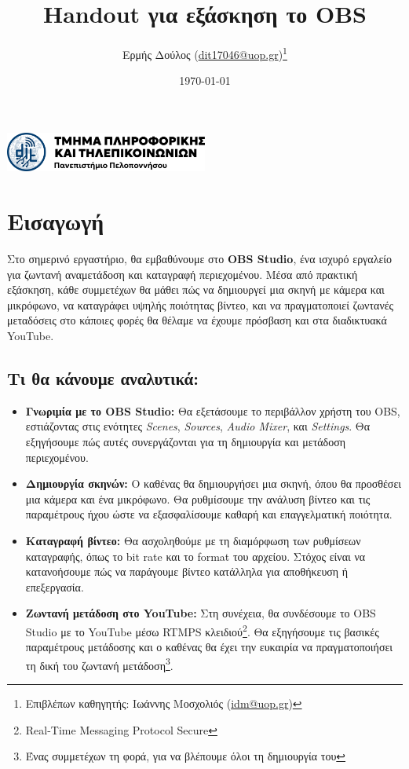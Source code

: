 \documentclass[12pt,a4paper]{article}
\title{\textbf{Handout για εξάσκηση το OBS}}
\author{Ερμής Δούλος (\href{mailto:dit17046@uop.gr}{dit17046@uop.gr})\thanks{Επιβλέπων καθηγητής: Ιωάννης Μοσχολιός (\href{mailto:idm@uop.gr}{idm@uop.gr})}}
\date{\today}
\begin{document}
\maketitle
\begin{center}
  \includegraphics[width=0.5\textwidth]{Figures/uop.png}
\end{center}
\tableofcontents
\noindent\makebox[\linewidth]{\rule{\textwidth}{1.5pt}}

\section*{Εισαγωγή}

Στο σημερινό εργαστήριο, θα εμβαθύνουμε στο \textbf{OBS Studio}, ένα ισχυρό εργαλείο
για ζωντανή αναμετάδοση και καταγραφή περιεχομένου. Μέσα από πρακτική εξάσκηση,
κάθε συμμετέχων θα μάθει πώς να δημιουργεί μια σκηνή με κάμερα και μικρόφωνο, να
καταγράφει υψηλής ποιότητας βίντεο, και να πραγματοποιεί ζωντανές μεταδόσεις στο
κάποιες φορές θα θέλαμε να έχουμε πρόσβαση και στα διαδικτυακά
YouTube.

\subsection*{Τι θα κάνουμε αναλυτικά:}

\begin{itemize}
  \item \textbf{Γνωριμία με το OBS Studio:} Θα εξετάσουμε το περιβάλλον χρήστη του
        OBS, εστιάζοντας στις ενότητες \textit{Scenes}, \textit{Sources}, \textit{Audio
          Mixer}, και \textit{Settings}. Θα εξηγήσουμε πώς αυτές συνεργάζονται για τη
        δημιουργία και μετάδοση περιεχομένου.

  \item \textbf{Δημιουργία σκηνών:} Ο καθένας θα δημιουργήσει μια σκηνή, όπου θα
        προσθέσει μια κάμερα και ένα μικρόφωνο. Θα ρυθμίσουμε την ανάλυση βίντεο και τις
        παραμέτρους ήχου ώστε να εξασφαλίσουμε καθαρή και επαγγελματική ποιότητα.

  \item \textbf{Καταγραφή βίντεο:} Θα ασχοληθούμε με τη διαμόρφωση των ρυθμίσεων
        καταγραφής, όπως το bit rate και το format του αρχείου. Στόχος είναι να κατανοήσουμε
        πώς να παράγουμε βίντεο κατάλληλα για αποθήκευση ή επεξεργασία.

  \item \textbf{Ζωντανή μετάδοση στο YouTube:} Στη συνέχεια, θα συνδέσουμε το OBS
        Studio με το YouTube μέσω RTMPS κλειδιού\footnote{Real-Time Messaging Protocol Secure}. Θα εξηγήσουμε τις βασικές παραμέτρους
        μετάδοσης και ο καθένας θα έχει την ευκαιρία να πραγματοποιήσει τη δική του
        ζωντανή μετάδοση\footnote{Ένας συμμετέχων τη φορά, για να βλέπουμε όλοι τη δημιουργία του}.
\end{itemize}
\end{document}
